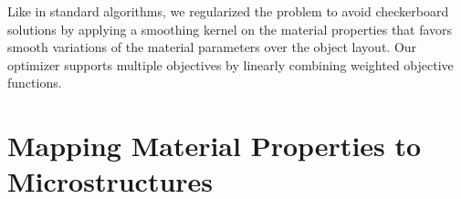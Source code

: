 Like in standard algorithms, we regularized the problem to avoid checkerboard solutions by applying a smoothing kernel on the material properties that favors smooth variations of the material parameters over the object layout.
Our optimizer supports multiple objectives by linearly combining weighted objective functions.
\section{Mapping Material Properties to Microstructures}
\begin{figure}
\end{figure}
